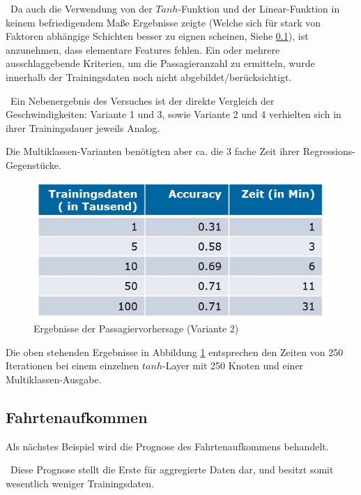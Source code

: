 ~\newline Da auch die Verwendung von der $Tanh$-Funktion und der Linear-Funktion in keinem befriedigendem Maße Ergebnisse zeigte (Welche sich für stark von Faktoren abhängige Schichten besser zu eignen scheinen, Siehe \ref{sec:RidesPred}), ist anzunehmen, dass elementare Features fehlen. Ein oder mehrere ausschlaggebende Kriterien, um die Passagieranzahl zu ermitteln, wurde innerhalb der Trainingsdaten noch nicht abgebildet/berücksichtigt. 

~\newline Ein Nebenergebnis des Versuches ist der direkte Vergleich der Geschwindigkeiten: Variante 1 und 3, sowie Variante 2 und 4 verhielten sich in ihrer Trainingsdauer jeweils Analog. 

Die Multiklassen-Varianten benötigten aber ca. die 3 fache Zeit ihrer Regressions-Gegenstücke.

\begin{figure}[h]
	\begin{center}
		\includegraphics[width=0.8\linewidth]{Bilder/PassagierErgebnisse}
		\caption[Ergebnisse der Passagiervorhersage]{Ergebnisse der Passagiervorhersage (Variante 2)}
		\label{fig:PasErg}
	\end{center}
\end{figure}


Die oben stehenden Ergebnisse in Abbildung \ref{fig:PasErg} entsprechen den Zeiten von 250 Iterationen bei einem einzelnen $tanh$-Layer mit 250 Knoten und einer Multiklassen-Ausgabe. 
\newpage
\subsection{Fahrtenaufkommen}
\label{sec:RidesPred}
Als nächstes Beispiel wird die Prognose des Fahrtenaufkommens behandelt. 

~\newline Diese Prognose stellt die Erste für aggregierte Daten dar, und besitzt somit wesentlich weniger Trainingsdaten.

